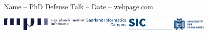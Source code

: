 \documentclass[64pt,aspectratio=169]{beamer}
\begin{document}
\begin{frame}[noframenumbering]{}
		{\large Name -- PhD Defense Talk -- Date -- \url{webpage.com}}
		
		\vfill
		
		\vfill
		\includegraphics[height=0.65cm]{assets/logos/mpilogo-inf-wide}
		\hspace*{0.35cm}
		\includegraphics[height=0.65cm,clip,trim={0 0 6cm 0}]{assets/logos/sic}
		\hspace*{0.35cm}
		\includegraphics[height=0.65cm]{assets/logos/uds}
		\vspace*{-0.5cm}
	\end{frame}
	\endgroup
\end{document}
